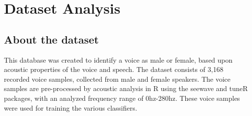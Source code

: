 \documentclass[12pt]{article}
\begin{document}
	\section{Dataset Analysis}
		\subsection{About the dataset}
			\begin{justify}
				This database was created to identify a voice as male or female, based upon acoustic properties of the voice and speech. The dataset consists of 3,168 recorded voice samples, collected from male and female speakers. The voice samples are pre-processed by acoustic analysis in R using the seewave and tuneR packages, with an analyzed frequency range of 0hz-280hz. These voice samples were used for training the various classifiers.
			\end{justify}
\end{document}
